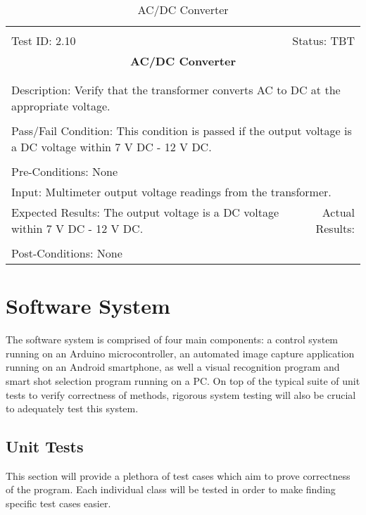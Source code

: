 \documentclass[titlepage]{article}
\begin{document}
\begin{center}%
\begin{table}
\begin{tabular}{|l r|}\hline&\\[-2mm]
	Test ID: 2.10	&Status: TBT\\[-3mm]
	\multicolumn{2}{|c|}{\textbf{\large{AC/DC Converter}}}\\&\\\hline&\\[-3mm]
	\multicolumn{2}{|p{\textwidth}|}{Description: Verify that the transformer converts AC to DC at the appropriate voltage.}\\[1mm]\hline&\\[-3mm]
	\multicolumn{2}{|p{\textwidth}|}{Pass/Fail Condition: This condition is passed if the output voltage is a DC voltage within 7 V DC - 12 V DC.}\\[1mm]\hline&\\[-3mm]
	\multicolumn{2}{|p{\textwidth}|}{Pre-Conditions: None}\\[4mm]
	\multicolumn{2}{|p{\textwidth}|}{Input: Multimeter output voltage readings from the transformer.}\\[2mm]\hline
	\multicolumn{1}{|p{0.49\textwidth}}{Expected Results: The output voltage is a DC voltage within 7 V DC - 12 V DC.}	&\multicolumn{1}{|p{0.45\textwidth}|}{Actual Results:}\\\hline&\\[-3mm]
	\multicolumn{2}{|p{\textwidth}|}{Post-Conditions: None}\\\hline
\end{tabular}
\caption{AC/DC Converter}
\end{table}
\end{center}


\section{Software System}
The software system is comprised of four main components: a control system running on an Arduino microcontroller, an automated image capture application running on an Android smartphone, as well a visual recognition program and smart shot selection program running on a PC. On top of the typical suite of unit tests to verify correctness of methods, rigorous system testing will also be crucial to adequately test this system.

\subsection{Unit Tests}%
This section will provide a plethora of test cases which aim to prove correctness of the program. Each individual class will be tested in order to make finding specific test cases easier.
\end{document}

